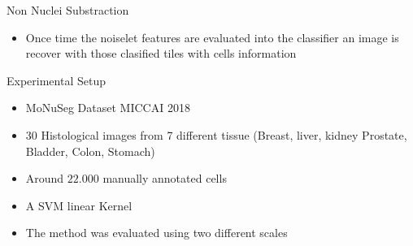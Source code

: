 \documentclass[usenames,dvipsnames]{beamer}
\begin{document}
\begin{frame}{Non Nuclei Substraction}
\begin{itemize}
\item Once time the noiselet features are evaluated into the classifier an image is recover with those clasified tiles with cells information
\end{itemize}{}
\end{frame}{}


\begin{frame}{Experimental Setup}
\begin{itemize}
\item MoNuSeg Dataset MICCAI 2018
\item 30 Histological images from 7 different tissue (Breast, liver, kidney Prostate, Bladder, Colon, Stomach) 
\item Around $22.000$ manually annotated cells
\item A SVM linear Kernel
\item The method was evaluated using two different scales

\end{itemize}
\end{frame}




\end{document}
